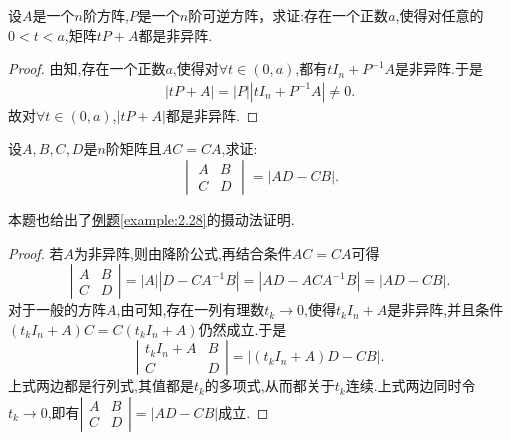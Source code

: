 \documentclass[../../main.tex]{subfiles}
\begin{document}
\begin{corollary}\label{corollary:矩阵可逆摄动的推论}
设\(A\)是一个\(n\)阶方阵,$P$是一个$n$阶可逆方阵，求证:存在一个正数\(a\),使得对任意的\(0 < t < a\),矩阵\(tP+A\)都是非异阵. 
\end{corollary}
\begin{proof}
由知,存在一个正数$a$,使得对$\forall t\in (0,a)$,都有$tI_n+P^{-1}A$是非异阵.于是
\begin{align*}
|tP+A|=|P||tI_n+P^{-1}A|\ne 0.
\end{align*}
故对$\forall t\in (0,a)$,$|tP+A|$都是非异阵.

\end{proof}

\begin{example}
设\(A,B,C,D\)是\(n\)阶矩阵且\(AC = CA\),求证:
\[
\begin{vmatrix}
A & B\\
C & D
\end{vmatrix}=|AD - CB|.
\]
\end{example}
\begin{note}
本题也给出了\hyperref[example:2.28]{例题\ref{example:2.28}}的摄动法证明.
\end{note}
\begin{proof}
若\(A\)为非异阵,则由降阶公式,再结合条件\(AC = CA\)可得
\[
\left|\begin{matrix}
A & B\\
C & D
\end{matrix}\right| = |A|\left|D - CA^{-1}B\right| = \left|AD - ACA^{-1}B\right| = |AD - CB|.
\]
对于一般的方阵\(A\),由可知,存在一列有理数\(t_k\rightarrow 0\),使得\(t_kI_n + A\)是非异阵,并且条件\((t_kI_n + A)C = C(t_kI_n + A)\)仍然成立.于是
\[
\left|\begin{matrix}
t_kI_n + A & B\\
C & D
\end{matrix}\right| = \left|(t_kI_n + A)D - CB\right|.
\]
上式两边都是行列式,其值都是\(t_k\)的多项式,从而都关于\(t_k\)连续.上式两边同时令\(t_k\rightarrow 0\),即有\(\left|\begin{matrix}
A & B\\
C & D
\end{matrix}\right| = |AD - CB|\)成立.

\end{proof}
\end{document}
